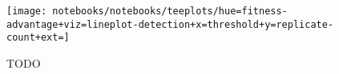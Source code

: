 \begin{figure}
  \centering
  \texttt{[image: notebooks/notebooks/teeplots/hue=fitness-advantage+viz=lineplot-detection+x=threshold+y=replicate-count+ext=]}
  \caption{TODO}
  \label{fig:selection-sensitivity-specificity}
\end{figure}
